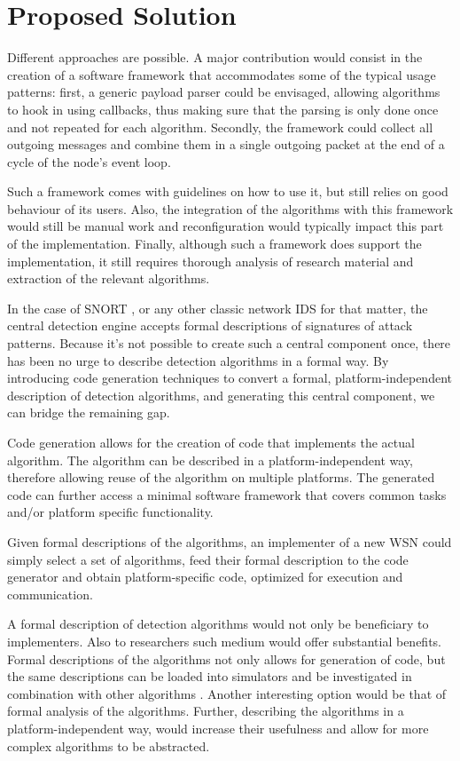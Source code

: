 \documentclass[conference]{IEEEtran}
\begin{document}
\section{Proposed Solution}
\label{section:solution}

Different approaches are possible. A major contribution would consist in the
creation of a software framework that accommodates some of the typical usage
patterns: first, a generic payload parser could be envisaged, allowing
algorithms to hook in using callbacks, thus making sure that the parsing is
only done once and not repeated for each algorithm. Secondly, the framework
could collect all outgoing messages and combine them in a single outgoing
packet at the end of a cycle of the node's event loop.

Such a framework comes with guidelines on how to use it, but still relies on
good behaviour of its users. Also, the integration of the algorithms with this
framework would still be manual work and reconfiguration would typically impact
this part of the implementation. Finally, although such a framework does
support the implementation, it still requires thorough analysis of research
material and extraction of the relevant algorithms.

In the case of SNORT \cite{roesch1999snort}, or any other classic network IDS
for that matter, the central detection engine accepts formal descriptions of
signatures of attack patterns. Because it's not possible to create such a
central component once, there has been no urge to describe detection algorithms
in a formal way. By introducing code generation techniques to convert a formal,
platform-independent description of detection algorithms, and generating this
central component, we can bridge the remaining gap.

Code generation allows for the creation of code that implements the actual
algorithm. The algorithm can be described in a platform-independent way,
therefore allowing reuse of the algorithm on multiple platforms. The generated
code can further access a minimal software framework that covers common tasks
and/or platform specific functionality.

Given formal descriptions of the algorithms, an implementer of a new WSN could
simply select a set of algorithms, feed their formal description to the code
generator and obtain platform-specific code, optimized for execution and
communication.

A formal description of detection algorithms would not only be beneficiary to
implementers. Also to researchers such medium would offer substantial benefits.
Formal descriptions of the algorithms not only allows for generation of code,
but the same descriptions can be loaded into simulators and be investigated in
combination with other algorithms \cite{mernik2005and}. Another interesting
option would be that of formal analysis of the algorithms. Further, describing
the algorithms in a platform-independent way, would increase their usefulness
and allow for more complex algorithms to be abstracted.
\end{document}

